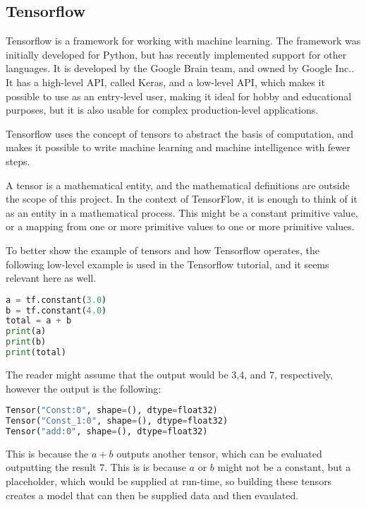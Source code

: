 \subsection{Tensorflow}
Tensorflow is a framework for working with machine learning\cite{tensorflow2015-whitepaper}.
The framework was initially developed for Python, but has recently implemented support for other languages.
It is developed by the Google Brain team, and owned by Google Inc.\cite{tensorflow-attribution}.
It has a high-level API, called Keras, and a low-level API, which makes it possible to use as an entry-level user, making it ideal for hobby and educational purposes, but it is also usable for complex production-level applications.

Tensorflow uses the concept of tensors to abstract the basis of computation, and makes it possible to write machine learning and machine intelligence with fewer steps.

A tensor is a mathematical entity, and the mathematical definitions are outside the scope of this project.
In the context of TensorFlow, it is enough to think of it as an entity in a mathematical process.
This might be a constant primitive value, or a mapping from one or more primitive values to one or more primitive values.

To better show the example of tensors and how Tensorflow operates, the following low-level example is used in the Tensorflow tutorial, and it seems relevant here as well.

\begin{lstlisting}[language=Python,label=lis:TensorFlowPy1,caption=Example of a Tensorflow program]
a = tf.constant(3.0)
b = tf.constant(4.0)
total = a + b
print(a)
print(b)
print(total)
\end{lstlisting}
The reader might assume that the output would be 3,4, and 7, respectively, however the output is the following:
\begin{lstlisting}[language=Python,label=lis:TensorFlowPy2,caption=Output of example \autoref{lis:TensorFlowPy2}]
Tensor("Const:0", shape=(), dtype=float32)
Tensor("Const_1:0", shape=(), dtype=float32)
Tensor("add:0", shape=(), dtype=float32)
\end{lstlisting}
This is because the $ a + b $ outputs another tensor, which can be evaluated outputting the result 7.
This is is because $a$ or $b$ might not be a constant, but a placeholder, which would be supplied at run-time, so building these tensors creates a model that can then be supplied data and then evaulated.


